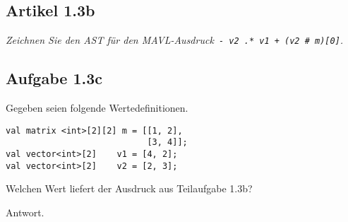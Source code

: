 \documentclass[
  ngerman,
  DIV=14
]{scrartcl}
\begin{document}
\subsection*{Artikel 1.3b}
\emph{Zeichnen Sie den AST für den MAVL-Ausdruck\texttt{ - v2 .* v1 + (v2 \# m)[0]}.}


\bigskip\noindent
{}

\subsection*{Aufgabe 1.3c}
Gegeben seien folgende Wertedefinitionen.
\begin{lstlisting}
val matrix <int>[2][2] m = [[1, 2],
                            [3, 4]];
val vector<int>[2]    v1 = [4, 2];
val vector<int>[2]    v2 = [2, 3];
\end{lstlisting}
Welchen Wert liefert der Ausdruck aus Teilaufgabe 1.3b?

\bigskip\noindent
Antwort.
\end{document}
